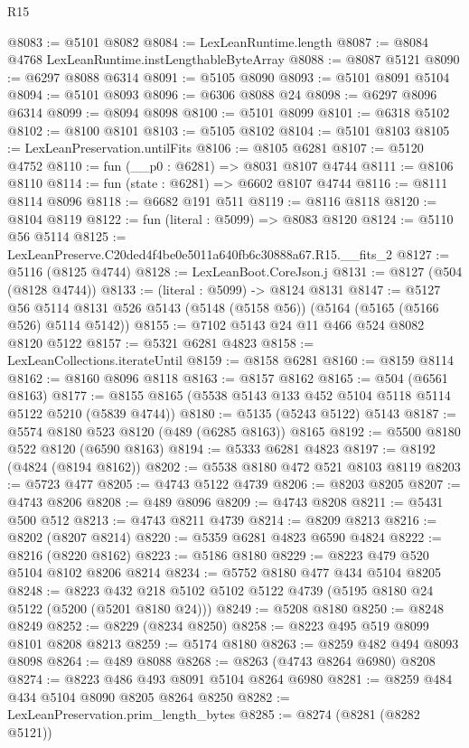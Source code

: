 \begin{lexlean}{R15}
\begin{coremodule}
{{{{{{{{{{{@8083 := @5101 @8082
@8084 := LexLeanRuntime.length
@8087 := @8084 @4768 LexLeanRuntime.instLengthableByteArray
@8088 := @8087 @5121
@8090 := @6297 @8088 @6314
@8091 := @5105 @8090
@8093 := @5101 @8091 @5104
@8094 := @5101 @8093
@8096 := @6306 @8088 @24
@8098 := @6297 @8096 @6314
@8099 := @8094 @8098
@8100 := @5101 @8099
@8101 := @6318 @5102
@8102 := @8100 @8101
@8103 := @5105 @8102
@8104 := @5101 @8103
@8105 := LexLeanPreservation.untilFits
@8106 := @8105 @6281
@8107 := @5120 @4752
@8110 := fun (__p0 : @6281) => @8031 @8107 @4744
@8111 := @8106 @8110
@8114 := fun (state : @6281) => @6602 @8107 @4744
@8116 := @8111 @8114 @8096
@8118 := @6682 @191 @511
@8119 := @8116 @8118
@8120 := @8104 @8119
@8122 := fun (literal : @5099) => @8083 @8120
@8124 := @5110 @56 @5114
@8125 := LexLeanPreserve.C20ded4f4be0e5011a640fb6c30888a67.R15.__fits_2
@8127 := @5116 (@8125 @4744)
@8128 := LexLeanBoot.CoreJson.j
@8131 := @8127 (@504 (@8128 @4744))
@8133 := (literal : @5099) -> @8124 @8131
@8147 := @5127
    @56
    @5114
    @8131
    @526
    @5143
    (@5148 (@5158 @56))
    (@5164 (@5165 (@5166 @526) @5114 @5142))
@8155 := @7102 @5143 @24 @11 @466 @524 @8082 @8120 @5122
@8157 := @5321 @6281 @4823
@8158 := LexLeanCollections.iterateUntil
@8159 := @8158 @6281
@8160 := @8159 @8114
@8162 := @8160 @8096 @8118
@8163 := @8157 @8162
@8165 := @504 (@6561 @8163)
@8177 := @8155 @8165 (@5538 @5143 @133 @452 @5104 @5118 @5114 @5122 @5210 (@5839 @4744))
@8180 := @5135 (@5243 @5122) @5143
@8187 := @5574 @8180 @523 @8120 (@489 (@6285 @8163)) @8165
@8192 := @5500 @8180 @522 @8120 (@6590 @8163)
@8194 := @5333 @6281 @4823
@8197 := @8192 (@4824 (@8194 @8162))
@8202 := @5538 @8180 @472 @521 @8103 @8119
@8203 := @5723 @477
@8205 := @4743 @5122 @4739
@8206 := @8203 @8205
@8207 := @4743 @8206
@8208 := @489 @8096
@8209 := @4743 @8208
@8211 := @5431 @500 @512
@8213 := @4743 @8211 @4739
@8214 := @8209 @8213
@8216 := @8202 (@8207 @8214)
@8220 := @5359 @6281 @4823 @6590 @4824
@8222 := @8216 (@8220 @8162)
@8223 := @5186 @8180
@8229 := @8223 @479 @520 @5104 @8102 @8206 @8214
@8234 := @5752 @8180 @477 @434 @5104 @8205
@8248 := @8223 @432 @218 @5102 @5102 @5122 @4739 (@5195 @8180 @24 @5122 (@5200 (@5201 @8180 @24)))
@8249 := @5208 @8180
@8250 := @8248 @8249
@8252 := @8229 (@8234 @8250)
@8258 := @8223 @495 @519 @8099 @8101 @8208 @8213
@8259 := @5174 @8180
@8263 := @8259 @482 @494 @8093 @8098
@8264 := @489 @8088
@8268 := @8263 (@4743 @8264 @6980) @8208
@8274 := @8223 @486 @493 @8091 @5104 @8264 @6980
@8281 := @8259 @484 @434 @5104 @8090 @8205 @8264 @8250
@8282 := LexLeanPreservation.prim_length_bytes
@8285 := @8274 (@8281 (@8282 @5121))
}}}}}}}}}}}
\end{coremodule}
\end{lexlean}
